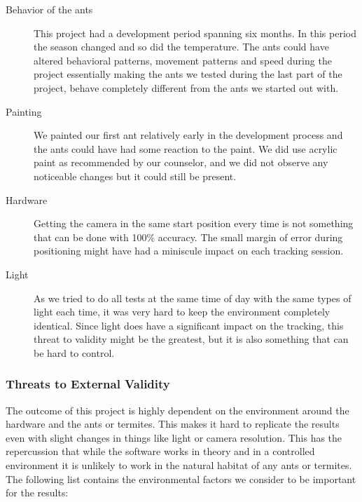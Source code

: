 \begin{description}
\item[Behavior of the ants] This project had a development period spanning six months. In this period the season changed and so did the temperature. The ants could have altered behavioral patterns, movement patterns and speed during the project essentially making the ants we tested during the last part of the project, behave completely different from the ants we started out with. \\

\item[Painting] We painted our first ant relatively early in the development process and the ants could have had some reaction to the paint. We did use acrylic paint as recommended by our counselor, and we did not observe any noticeable changes but it could still be present. \\

\item[Hardware] Getting the camera in the same start position every time is not something that can be done with 100\% accuracy. The small margin of error during positioning might have had a miniscule impact on each tracking session. \\

\item[Light] As we tried to do all tests at the same time of day with the same types of light each time, it was very hard to keep the environment completely identical. Since light does have a significant impact on the tracking, this threat to validity might be the greatest, but it is also something that can be hard to control. \\    
\end{description}

\subsubsection{Threats to External Validity} \mbox{}\par

The outcome of this project is highly dependent on the environment around the hardware and the ants or termites. This makes it hard to replicate the results even with slight changes in things like light or camera resolution. This has the repercussion that while the software works in theory and in a controlled environment it is unlikely to work in the natural habitat of any ants or termites. The following list contains the environmental factors we consider to be important for the results:

